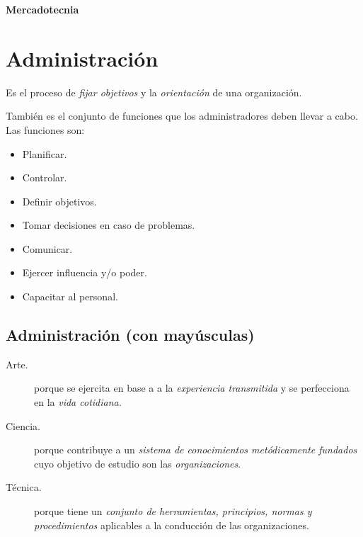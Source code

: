 \documentclass[spanish, twocolumn, twoside,openany]{book}
\begin{document}
\begin{titlepage}
	
	\centering
	\vspace*{\fill}
	{\Huge\textbf{Mercadotecnia}\par}
	\vspace*{\fill}
	
	
	
\end{titlepage}

 \tableofcontents






\newpage



\chapter{Administración}
Es el proceso de \emph{fijar objetivos} y la \emph{orientación} de una organización.

También es el conjunto de funciones que los administradores deben llevar a cabo. Las funciones son:
\begin{itemize}
	\item Planificar.
	\item Controlar.
	\item Definir objetivos.
	\item Tomar decisiones en caso de problemas.
	\item Comunicar.
	\item Ejercer influencia y/o poder.
	\item Capacitar al personal.
\end{itemize}

\section{Administración (con mayúsculas)}
\begin{description}
	\item[Arte.]	porque se ejercita en base a a la \emph{experiencia transmitida} y  se perfecciona en la \emph{vida cotidiana.}
\item[Ciencia.] porque contribuye a un \emph{sistema de conocimientos metódicamente fundados} cuyo objetivo de estudio son las \emph{organizaciones}.
\item[Técnica.] porque tiene un \emph{conjunto de herramientas, principios, normas y procedimientos} aplicables a la conducción de las organizaciones.
\end{description}
\end{document}
